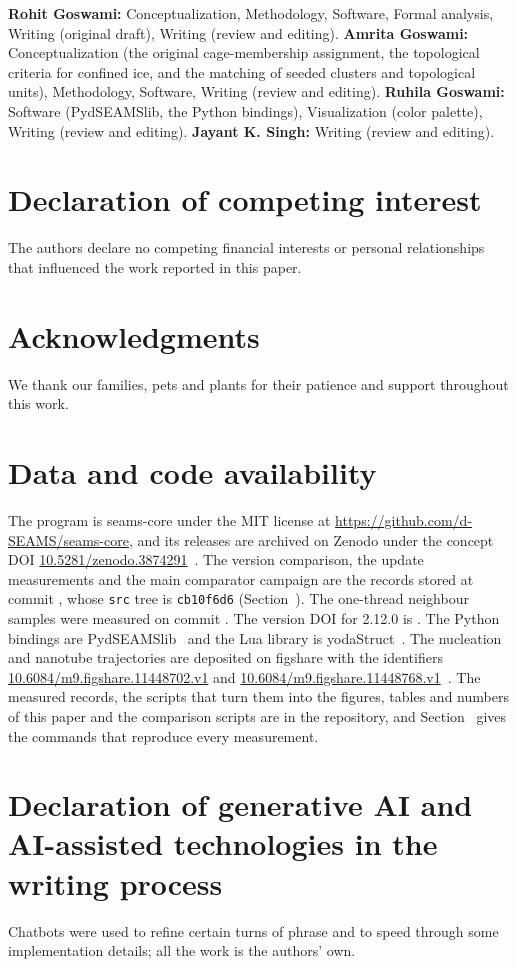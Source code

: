 \documentclass[preprint,12pt]{elsarticle}
\begin{document}
\textbf{Rohit Goswami:} Conceptualization, Methodology, Software, Formal analysis, Writing (original draft), Writing (review and editing).
\textbf{Amrita Goswami:} Conceptualization (the original cage-membership assignment, the topological criteria for confined ice, and the matching of seeded clusters and topological units), Methodology, Software, Writing (review and editing).
\textbf{Ruhila Goswami:} Software (PydSEAMSlib, the Python bindings), Visualization (color palette), Writing (review and editing).
\textbf{Jayant K. Singh:} Writing (review and editing).

\section*{Declaration of competing interest}

The authors declare no competing financial interests or personal relationships that influenced the work reported in this paper.

\section*{Acknowledgments}

We thank our families, pets and plants for their patience and support throughout this work.

\section*{Data and code availability}

The program is seams-core under the MIT license at \url{https://github.com/d-SEAMS/seams-core}, and its releases are archived on Zenodo under the concept DOI \href{https://doi.org/10.5281/zenodo.3874291}{10.5281/zenodo.3874291}~\cite{seamscore2026}.
The version comparison, the update measurements and the main comparator campaign are the records stored at commit \texttt{}, whose \texttt{src} tree is \texttt{cb10f6d6} (Section~).
The one-thread neighbour samples were measured on commit \texttt{}.
The version DOI for 2.12.0 is \DOIPENDING.
The Python bindings are PydSEAMSlib~\cite{pydseamslib2026} and the Lua library is yodaStruct~\cite{yodastruct2026}.
The nucleation and nanotube trajectories are deposited on figshare with the identifiers \href{https://doi.org/10.6084/m9.figshare.11448702.v1}{10.6084/m9.figshare.11448702.v1} and \href{https://doi.org/10.6084/m9.figshare.11448768.v1}{10.6084/m9.figshare.11448768.v1}~\cite{goswami2019nucleationdata,goswami2019nanotubedata}.
The measured records, the scripts that turn them into the figures, tables and numbers of this paper and the comparison scripts are in the repository, and Section~ gives the commands that reproduce every measurement.

\section*{Declaration of generative AI and AI-assisted technologies in the writing process}

Chatbots were used to refine certain turns of phrase and to speed through some implementation details; all the work is the authors' own.

 
\end{document}

